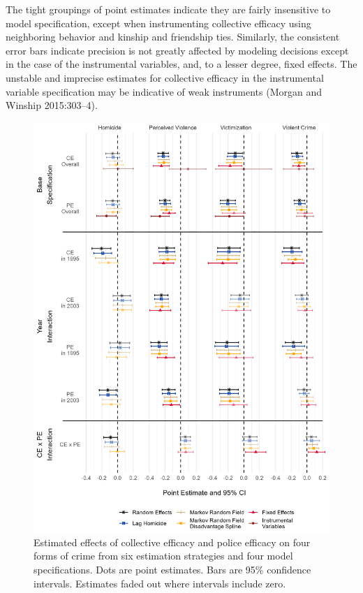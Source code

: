\documentclass [11pt, proquest] {uwthesis}[2015/03/03]
\begin{document}
The tight groupings of point estimates indicate they are fairly insensitive to model specification, except when instrumenting collective efficacy using neighboring behavior and kinship and friendship ties. Similarly, the consistent error bars indicate precision is not greatly affected by modeling decisions except in the case of the instrumental variables, and, to a lesser degree, fixed effects. The unstable and imprecise estimates for collective efficacy in the instrumental variable specification may be indicative of weak instruments (Morgan and Winship 2015:303--4).
\begin{figure}

{\centering \includegraphics[width=0.8\linewidth]{./figure/ch3/ce_pe_plot_vertical} 

}

\caption{Estimated effects of collective efficacy and police efficacy on four forms of crime from six estimation strategies and four model specifications. Dots are point estimates. Bars are 95\% confidence intervals. Estimates faded out where intervals include zero.}\label{fig:fccoefplot}
\end{figure}
\end{document}
